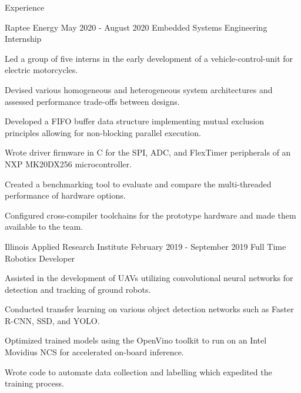 \documentclass{resume} %
\begin{document}
    \begin{rSection}{Experience}

		\begin{rSubsection}{Raptee Energy} {May 2020 - August 2020} {Embedded Systems Engineering Internship}

			\item Led a group of five interns in the early development of a vehicle-control-unit for electric motorcycles.
			\item Devised various homogeneous and heterogeneous system architectures and assessed performance trade-offs between designs.
			\item Developed a FIFO buffer data structure implementing mutual exclusion principles allowing for non-blocking parallel execution.
			\item Wrote driver firmware in C for the SPI, ADC, and FlexTimer peripherals of an NXP MK20DX256 microcontroller.
			\item Created a benchmarking tool to evaluate and compare the multi-threaded performance of hardware options.
			\item Configured cross-compiler toolchains for the prototype hardware and made them available to the team.

		\end{rSubsection}

        \begin{rSubsection}{Illinois Applied Research Institute} {February 2019 - September 2019} {Full Time Robotics Developer}

            \item Assisted in the development of UAVs utilizing convolutional neural networks for detection and tracking of ground robots.
            \item Conducted transfer learning on various object detection networks such as Faster R-CNN, SSD, and YOLO.
            \item Optimized trained models using the OpenVino toolkit to run on an Intel Movidius NCS for accelerated on-board inference.
            \item Wrote code to automate data collection and labelling which expedited the training process.

        \end{rSubsection}

    \end{rSection}

\end{document}
